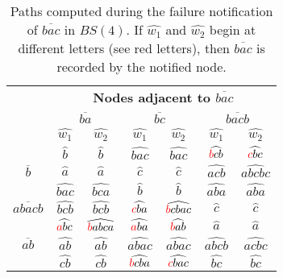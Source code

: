 \begin{table}[!t]
\centering

\caption{Paths computed during the failure notification of $\overline{bac}$ in $BS(4)$. If $\widehat{w_1}$ and $\widehat{w_2}$ begin at different letters (see red letters), then $\overline{bac}$ is recorded by the notified node.}

\label{tb:paths_computed_nodef}
\small
\begin{tabular}{| c |c c| c c| c c |}
\hline
\rowcolor{gray!30}\multicolumn{1}{|c|}{{\textbf{Notified}}}&\multicolumn{6}{c|}{{\textbf{Nodes adjacent to $\overline{bac}$}}}\\
\cline{2-7}
\rowcolor{gray!30}\multicolumn{1}{|c|}{{\textbf{node}}}& \multicolumn{2}{c|}{{$\overline{ba}$}} & \multicolumn{2}{c|}{{$\overline{bc}$}} & \multicolumn{2}{c|}{{$\overline{bacb}$}}\\ 
\hline
\hline
\rowcolor{gray!30}\multicolumn{1}{|c|}{\textbf{$\overline{u}$}}& {$\widehat{w_1}$} & $\widehat{w_2}$& {$\widehat{w_1}$} & $\widehat{w_2}$& {$\widehat{w_1}$} & $\widehat{w_2}$\\ 
  \hline
  \hline
\rowcolor{gray!10}\multirow{1}{*}{$\overline{aba}$}&$\widehat{b}$&$\widehat{b}$ &$\widehat{bac}$ &$\widehat{bac}$ & $\widehat{\textcolor{red}{b}cb}$& $\widehat{\textcolor{red}{c}bc}$ \\   
\multirow{1}{*}{$\overline{b}$}&$\widehat{a}$&$\widehat{a}$ &$\widehat{c}$ &$\widehat{c}$& $\widehat{acb}$ & $\widehat{abcbc}$ \\
\rowcolor{gray!10}\multirow{1}{*}{$\overline{bcb}$}&$\widehat{bac}$&$\widehat{bca}$ &$\widehat{b}$&$\widehat{b}$ & $\widehat{aba}$& $\widehat{aba}$\\
\multirow{1}{*}{$\overline{abacb}$}&$\widehat{bcb}$&$\widehat{bcb}$ &$\widehat{\textcolor{red}{c}ba}$ &$\widehat{\textcolor{red}{b}cbac}$ & $\widehat{c}$& $\widehat{c}$ \\
\rowcolor{gray!10}\multirow{1}{*}{$\overline{bacba}$}&$\widehat{\textcolor{red}{a}bc}$&$\widehat{\textcolor{red}{b}abca}$ &$\widehat{\textcolor{red}{a}ba}$ &$\widehat{\textcolor{red}{b}ab}$ & $\widehat{a}$& $\widehat{a}$ \\
\hline
 \hline
 \multirow{1}{*}{$\overline{ab}$}&$\widehat{ab}$&$\widehat{ab}$ &$\widehat{abac}$ &$\widehat{abac}$& $\widehat{abcb}$ & $\widehat{acbc}$ \\ 
 \rowcolor{gray!10}\multirow{1}{*}{$\overline{abac}$}&$\widehat{cb}$&$\widehat{cb}$&$\widehat{\textcolor{red}{b}cba}$ &$\widehat{\textcolor{red}{c}bac}$& $\widehat{bc}$ & $\widehat{bc}$ \\   

\end{tabular}
\end{table}
